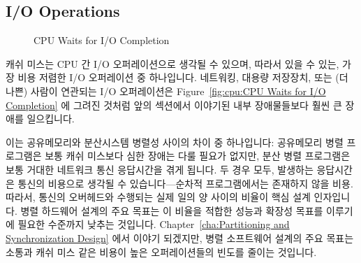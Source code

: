 \subsection{I/O Operations}
\label{sec:cpu:I/O Operations}

\begin{figure}[tb]
\centering
{}
\caption{CPU Waits for I/O Completion}
\end{figure}

캐쉬 미스는 CPU 간 I/O 오퍼레이션으로 생각될 수 있으며, 따라서 있을 수 있는,
가장 비용 저렴한 I/O 오퍼레이션 중 하나입니다.
네트워킹, 대용량 저장장치, 또는 (더 나쁜) 사람이 연관되는 I/O 오퍼레이션은
Figure~\ref{fig:cpu:CPU Waits for I/O Completion}
에 그려진 것처럼 앞의 섹션에서 이야기된 내부 장애물들보다 훨씬 큰 장애를
일으킵니다.

이는 공유메모리와 분산시스템 병렬성 사이의 차이 중 하나입니다: 공유메모리 병렬
프로그램은 보통 캐쉬 미스보다 심한 장애는 다룰 필요가 없지만, 분산 병렬
프로그램은 보통 거대한 네트워크 통신 응답시간을 겪게 됩니다.
두 경우 모두, 발생하는 응답시간은 통신의 비용으로 생각될 수 있습니다---순차적
프로그램에서는 존재하지 않을 비용.
따라서, 통신의 오버헤드와 수행되는 실제 일의 양 사이의 비율이 핵심 설계
인자입니다.
병렬 하드웨어 설계의 주요 목표는 이 비율을 적합한 성능과 확장성 목표를 이루기에
필요한 수준까지 낮추는 것입니다.
Chapter~\ref{cha:Partitioning and Synchronization Design} 에서 이야기 되겠지만,
병렬 소프트웨어 설계의 주요 목표는 소통과 캐쉬 미스 같은 비용이 높은
오퍼레이션들의 빈도를 줄이는 것입니다.

